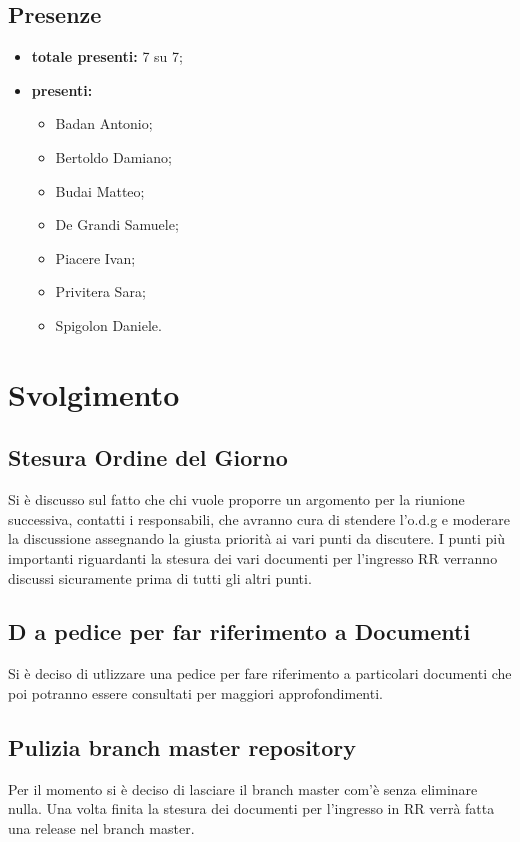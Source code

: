 \subsection*{Presenze}
\begin{itemize}
	\item \textbf{totale presenti:} 7 su 7;
	\item \textbf{presenti: }
	\begin{itemize}
		\item Badan Antonio;
		\item Bertoldo Damiano;
		\item Budai Matteo;
		\item De Grandi Samuele;
		\item Piacere Ivan;
		\item Privitera Sara;
		\item Spigolon Daniele.
	\end{itemize}
\end{itemize}

\section*{Svolgimento}


\subsection*{Stesura Ordine del Giorno}
Si è discusso sul fatto che chi vuole proporre un argomento per la riunione successiva, contatti i responsabili, che avranno cura di stendere l'o.d.g e moderare la discussione assegnando la giusta priorità ai vari punti da discutere.
I punti più importanti riguardanti la stesura dei vari documenti per l'ingresso RR verranno discussi sicuramente prima di tutti gli altri punti.

\subsection*{D a pedice per far riferimento a Documenti}
Si è deciso di utlizzare una  pedice per fare riferimento a particolari documenti che poi potranno essere consultati per maggiori approfondimenti.

\subsection*{Pulizia branch master repository}
Per il momento si è deciso di lasciare il branch master com'è senza eliminare nulla. Una volta finita la stesura dei documenti per l'ingresso in RR verrà fatta una release nel branch master.

